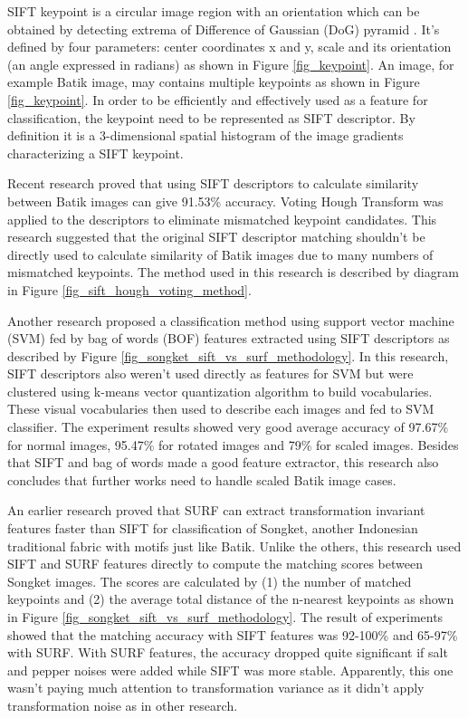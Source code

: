 \documentclass[conference]{IEEEtran}
\begin{document}
SIFT keypoint is a circular image region with an orientation which can be obtained by detecting extrema of Difference of Gaussian (DoG) pyramid \cite{lowe2004distinctive}. It's defined by four parameters: center coordinates x and y, scale and its orientation (an angle expressed in radians) as shown in Figure \ref{fig_keypoint}. An image, for example Batik image, may contains multiple keypoints as shown in Figure \ref{fig_keypoint}. In order to be efficiently and effectively used as a feature for classification, the keypoint need to be represented as SIFT descriptor. By definition it is a 3-dimensional spatial histogram of the image gradients characterizing a SIFT keypoint.

Recent research \cite{nurhaida2015automatic} proved that using SIFT descriptors to calculate similarity between Batik images can give 91.53\% accuracy. Voting Hough Transform was applied to the descriptors to eliminate mismatched keypoint candidates. This research suggested that the original SIFT descriptor matching shouldn't be directly used to calculate similarity of Batik images due to many numbers of mismatched keypoints. The method used in this research is described by diagram in Figure \ref{fig_sift_hough_voting_method}.

Another research \cite{azhar2015batik} proposed a classification method using support vector machine (SVM) fed by bag of words (BOF) features extracted using SIFT descriptors as described by Figure \ref{fig_songket_sift_vs_surf_methodology}. In this research, SIFT descriptors also weren't used directly as features for SVM but were clustered using k-means vector quantization algorithm to build vocabularies. These visual vocabularies then used to describe each images and fed to SVM classifier. The experiment results showed very good average accuracy of 97.67\% for normal images, 95.47\% for rotated images and 79\% for scaled images. Besides that SIFT and bag of words made a good feature extractor, this research also concludes that further works need to handle scaled Batik image cases.

An earlier research \cite{willy2013evaluation} proved that SURF can extract transformation invariant features faster than SIFT for classification of Songket, another Indonesian traditional fabric with motifs just like Batik. Unlike the others, this research used SIFT and SURF features directly to compute the matching scores between Songket images. The scores are calculated by (1) the number of matched keypoints and (2) the average total distance of the n-nearest keypoints as shown in Figure \ref{fig_songket_sift_vs_surf_methodology}. The result of experiments showed that the matching accuracy with SIFT features was 92-100\% and 65-97\% with SURF. With SURF features, the accuracy dropped quite significant if salt and pepper noises were added while SIFT was more stable. Apparently, this one wasn't paying much attention to transformation variance as it didn't apply transformation noise as in other research\cite{azhar2015batik}.
\end{document}
